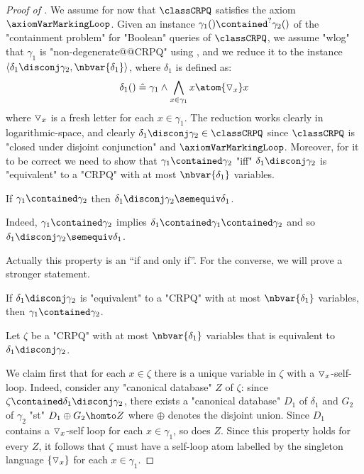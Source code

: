 \begin{proof}[Proof of ]
	We assume for now that $\classCRPQ$ satisfies
	the axiom $\axiomVarMarkingLoop$.
	Given an instance $\gamma_1() \contained^{?} \gamma_2()$ of the "containment problem" for "Boolean" queries of $\classCRPQ$,
	we assume "wlog" that $\gamma_1$ is "non-degenerate@@CRPQ" using ,
	and we reduce it to the instance $\langle \delta_1 \disconj \gamma_2, \nbvar{\delta_1} \rangle$,
	where $\delta_1$ is defined as:
	\[
		\delta_1() \defeq \gamma_1 \land \bigwedge_{x \in \gamma_1} x \atom{\marking_x} x
	\]
	where $\triangledown_x$ is a fresh letter for each $x \in \gamma_1$.
	The reduction works clearly in logarithmic-space,
	and clearly $\delta_1 \disconj \gamma_2 \in \classCRPQ$ since
	$\classCRPQ$ is "closed under disjoint conjunction" and $\axiomVarMarkingLoop$.
	Moreover, for it to be correct
	we need to show that $\gamma_1 \contained \gamma_2$ "iff" $\delta_1 \disconj \gamma_2$
	is "equivalent" to a "CRPQ" with at most $\nbvar{\delta_1}$ variables.

	\begin{claim}
		\AP\label{claim:reduction-containment-to-variable-minimization-1}
		If $\gamma_1 \contained \gamma_2$ then $\delta_1 \disconj \gamma_2 \semequiv \delta_1$.
	\end{claim}

	Indeed, $\gamma_1 \contained \gamma_2$ implies $\delta_1 \contained \gamma_1 \contained \gamma_2$ and so $\delta_1 \disconj \gamma_2 \semequiv \delta_1$.

	Actually this property is an ``if and only if''. For the converse, we will prove a stronger statement.

	\begin{claim}
		\AP\label{claim:reduction-containment-to-variable-minimization-2}
		If $\delta_1 \disconj \gamma_2$ is "equivalent" to a "CRPQ"
		with at most $\nbvar{\delta_1}$ variables, then $\gamma_1 \contained \gamma_2$.
	\end{claim}

	Let $\zeta$ be a "CRPQ" with at most $\nbvar{\delta_1}$ variables
	that is equivalent to $\delta_1 \disconj \gamma_2$.
	
	We claim first that for each $x \in \zeta$ there is a
	unique variable in $\zeta$ with a $\triangledown_x$-self-loop.
	Indeed, consider any "canonical database" $Z$ of $\zeta$:
	since $\zeta \contained \delta_1 \disconj \gamma_2$, there exists
	a "canonical database" $D_1$ of $\delta_1$ and $G_2$ of $\gamma_2$ "st"
	$D_1 \oplus G_2 \homto Z$ where $\oplus$ denotes the disjoint union.
	Since $D_1$ contains a $\triangledown_x$-self loop for each $x\in \gamma_1$,
	so does $Z$. Since this property holds for every $Z$, it follows that
	$\zeta$ must have a self-loop atom labelled by the singleton language $\{\triangledown_x\}$
	for each $x\in \gamma_1$.


\end{proof}
